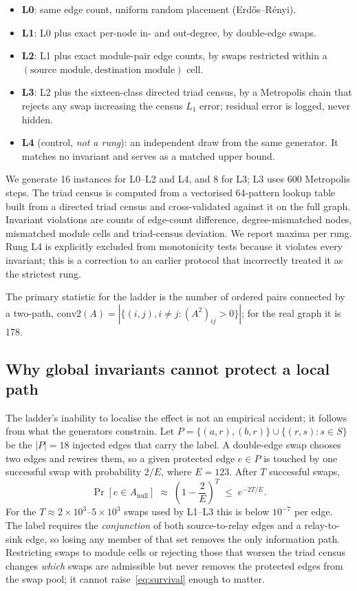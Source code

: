 \documentclass[10pt,twocolumn,letterpaper]{article}
\begin{document}
\begin{itemize}
\item \textbf{L0}: same edge count, uniform random placement (Erd\H{o}s--R\'enyi).
\item \textbf{L1}: L0 plus exact per-node in- and out-degree, by double-edge swaps.
\item \textbf{L2}: L1 plus exact module-pair edge counts, by swaps restricted
  within a $(\text{source module},\text{destination module})$ cell.
\item \textbf{L3}: L2 plus the sixteen-class directed triad census, by a
  Metropolis chain that rejects any swap increasing the census $L_1$ error;
  residual error is logged, never hidden.
\item \textbf{L4} (control, \emph{not a rung}): an independent draw from the
  same generator. It matches no invariant and serves as a matched upper bound.
\end{itemize}

We generate 16 instances for L0--L2 and L4, and 8 for L3;
L3 uses 600 Metropolis steps. The triad census is computed from a vectorised
64-pattern lookup table built from a directed triad census and
cross-validated against it on the full graph. Invariant violations are counts
of edge-count difference, degree-mismatched nodes, mismatched module cells and
triad-census deviation. We report maxima per rung. Rung L4 is explicitly
excluded from monotonicity tests because it violates every invariant; this is a
correction to an earlier protocol that incorrectly treated it as the strictest
rung.

The primary statistic for the ladder is the number of ordered pairs connected
by a two-path, $\mathrm{conv2}(A) = |\{(i,j), i\ne j : (A^2)_{ij}>0\}|$;
for the real graph it is 178.

\subsection{Why global invariants cannot protect a local path}
\label{sec:theory}

The ladder's inability to localise the effect is not an empirical accident;
it follows from what the generators constrain. Let
$P=\{(a,r),(b,r)\}\cup\{(r,s): s\in S\}$ be the $|P|=18$ injected edges that
carry the label. A double-edge swap chooses two edges and rewires them, so a
given protected edge $e\in P$ is touched by one successful swap with
probability $2/E$, where $E=123$. After $T$ successful swaps,
\begin{equation}
\Pr[e\in A_{\text{null}}]\;\approx\;\left(1-\frac{2}{E}\right)^{T}
\;\le\;e^{-2T/E}.
\label{eq:survival}
\end{equation}
For the $T\!\approx\!2\!\times\!10^{3}$--$5\!\times\!10^{3}$ swaps used by
L1--L3 this is below $10^{-7}$ per edge. The label requires the
\emph{conjunction} of both source-to-relay edges and a relay-to-sink edge, so
losing any member of that set removes the only information path. Restricting
swaps to module cells or rejecting those that worsen the triad census changes
\emph{which} swaps are admissible but never removes the protected edges from
the swap pool; it cannot raise~\eqref{eq:survival} enough to matter.
\end{document}
